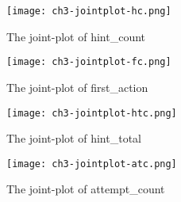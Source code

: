 \begin{figure}[htb]
    \centering
    \texttt{[image: ch3-jointplot-hc.png]}
    \caption[dis]{The joint-plot of hint\_count}\label{fig:ch3-jointplot-hc}
\end{figure}

\begin{figure}[htb]
    \centering
    \texttt{[image: ch3-jointplot-fc.png]}
    \caption{The joint-plot of first\_action}\label{fig:ch3-jointplot-fc}
\end{figure}

\begin{figure}[htb]
    \centering
    \texttt{[image: ch3-jointplot-htc.png]}
    \caption[dis]{The joint-plot of hint\_total}\label{fig:ch3-jointplot-htc}
\end{figure}

\begin{figure}[htb]
    \centering
    \texttt{[image: ch3-jointplot-atc.png]}
    \caption{The joint-plot of attempt\_count}\label{fig:ch3-jointplot-atc}
\end{figure}



